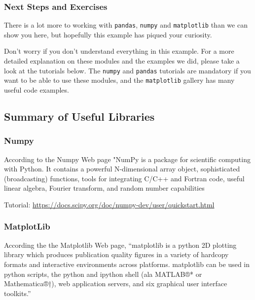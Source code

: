 \subsubsection{Next Steps and Exercises}\label{next-steps-and-exercises}

There is a lot more to working with \texttt{pandas}, \texttt{numpy} and
\texttt{matplotlib} than we can show you here, but hopefully this
example has piqued your curiosity.

Don't worry if you don't understand everything in this example. For a
more detailed explanation on these modules and the examples we did,
please take a look at the tutorials below. The \texttt{numpy} and
\texttt{pandas} tutorials are mandatory if you want to be able to use
these modules, and the \texttt{matplotlib} gallery has many useful code
examples.

\subsection{Summary of Useful
Libraries}\label{summary-of-useful-libraries}

\subsubsection{Numpy}\label{numpy}



According to the Numpy Web page "NumPy is a package for scientific
computing with Python. It contains a powerful N-dimensional array
object, sophisticated (broadcasting) functions, tools for integrating
C/C++ and Fortran code, useful linear algebra, Fourier transform, and
random number capabilities

Tutorial:
\url{https://docs.scipy.org/doc/numpy-dev/user/quickstart.html}

\subsubsection{MatplotLib}\label{matplotlib}


According the the Matplotlib Web page, ``matplotlib is a python 2D
plotting library which produces publication quality figures in a variety
of hardcopy formats and interactive environments across platforms.
matplotlib can be used in python scripts, the python and ipython shell
(ala MATLAB®* or Mathematica®†), web application servers, and six
graphical user interface toolkits.''

